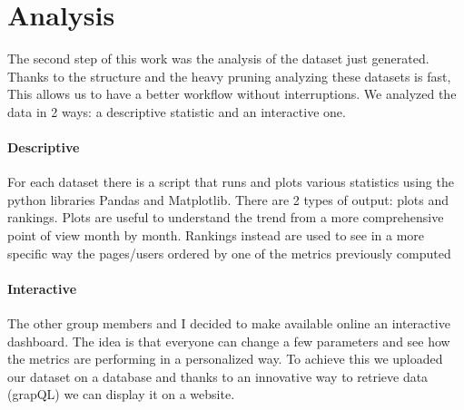 \section{Analysis}
The second step of this work was the analysis of the dataset just generated. Thanks to the structure
and the heavy pruning analyzing these datasets is fast, This allows us to have a better workflow
without interruptions. We analyzed the data in 2 ways: a descriptive statistic and an interactive
one.
\paragraph{Descriptive}
For each dataset there is a script that runs and plots various statistics using the python libraries
Pandas and Matplotlib. There are 2 types of output: plots and rankings. 
Plots are useful to understand the trend from a more comprehensive point of view month by month.  
Rankings instead are used to see in a more specific way the pages/users ordered by one of the
metrics previously computed 

\paragraph{Interactive}
The other group members and I decided to make available online an interactive dashboard. The idea is
that everyone can change a few parameters and see how the metrics are performing in a personalized
way. To achieve this we uploaded our dataset on a database and thanks to an innovative way to retrieve
data (grapQL) we can display it on a website.

